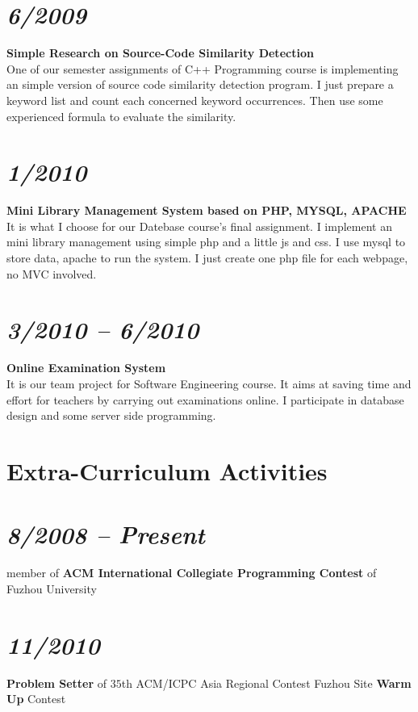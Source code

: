 \documentclass[margin,line]{res}
\newcommand{\ressection}[1]{
    {\colorbox{bg}{\fontfamily{phv}\selectfont\large#1}}
}
\begin{document}
\begin{resume}
\section{\em 6/2009}
\textbf{Simple Research on Source-Code Similarity Detection}\\
One of our semester assignments of C++ Programming course is implementing
an simple version of source code similarity detection program. I just prepare a keyword list and count each concerned keyword occurrences.
Then use some experienced formula to evaluate the similarity.

\section{\em 1/2010}
\textbf{Mini Library Management System based on PHP, MYSQL, APACHE}\\
It is what I choose for our Datebase course's final assignment. I implement an mini library
management using simple php and a little js and css. I use mysql to store data, apache to run the system.
I just create one php file for each webpage, no MVC involved.

\section{\em 3/2010 -- 6/2010}
\textbf{Online Examination System}\\
It is our team project for Software Engineering course. It aims at saving time and effort for teachers by carrying out examinations online.
I participate in database design and some server side programming.

\section{\ressection{Extra-Curriculum Activities}}
\vspace{5mm}
\section{\em 8/2008 -- Present} member of \textbf{ACM International Collegiate
Programming Contest} of Fuzhou University\vspace{-5mm}
\section{\em 11/2010} \textbf{Problem Setter} of $35$th ACM/ICPC Asia Regional Contest Fuzhou Site \textbf{Warm Up} Contest\vspace{-5mm}

\end{resume}
\end{document}
